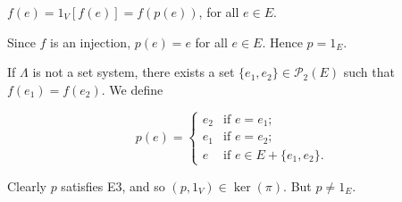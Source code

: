 $f(e) = 1_V[f(e)] = f(p(e))$, for all $e \in E$.

Since $f$ is an injection, $p(e) = e$ for all $e \in E$. Hence $p = 1_E$.

If $\Lambda$ is not a set system, there exists a set $\{e_1, e_2\} \in \mathcal{P}_2(E)$ such that $f(e_1) = f(e_2)$. We define

$$p(e) = \begin{cases} e_2 & \text{if } e = e_1; \\ e_1 & \text{if } e = e_2; \\ e & \text{if } e \in E + \{e_1, e_2\}. \end{cases}$$

Clearly $p$ satisfies E3, and so $(p, 1_V) \in \ker(\pi)$. But $p \neq 1_E$.
